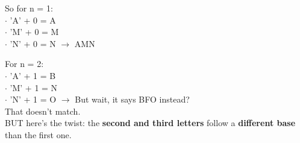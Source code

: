 \documentclass[fleqn]{article}
\begin{document}
{So for \colorbox{gray!20}{n = 1}:
\vspace*{0.2cm} \\
$\cdot$ 'A' + 0 = A \\
$\cdot$ 'M' + 0 = M \\
$\cdot$ 'N' + 0 = N $\rightarrow$ AMN 
\vspace*{0.3cm}

For \colorbox{gray!20}{n = 2}:
\vspace*{0.2cm} \\
$\cdot$ 'A' + 1 = B \\
$\cdot$ 'M' + 1 = N \\
$\cdot$ 'N' + 1 = O $\rightarrow$ But wait, it says BFO instead? \\
\hspace*{5pt} That doesn’t match. \\
BUT here’s the {twist}: the \textbf{second and third letters} follow a \textbf{different base} than the first one.
}
\end{document}
